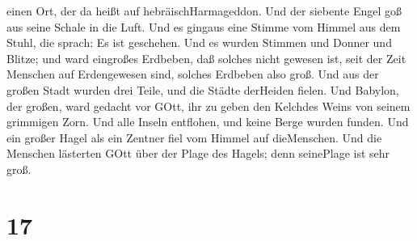 einen Ort, der da heißt auf hebräischHarmageddon.  Und der
siebente Engel goß aus seine Schale in die Luft. Und es gingaus eine
Stimme vom Himmel aus dem Stuhl, die sprach: Es ist geschehen.
 Und es wurden Stimmen und Donner und Blitze; und ward
eingroßes Erdbeben, daß solches nicht gewesen ist, seit der Zeit
Menschen auf Erdengewesen sind, solches Erdbeben also groß.
 Und aus der großen Stadt wurden drei Teile, und die Städte
derHeiden fielen. Und Babylon, der großen, ward gedacht vor GOtt, ihr zu
geben den Kelchdes Weins von seinem grimmigen Zorn.  Und
alle Inseln entflohen, und keine Berge wurden funden.  Und
ein großer Hagel als ein Zentner fiel vom Himmel auf dieMenschen. Und
die Menschen lästerten GOtt über der Plage des Hagels; denn seinePlage
ist sehr groß.

\hypertarget{section-15}{%
\section{17}\label{section-15}}


